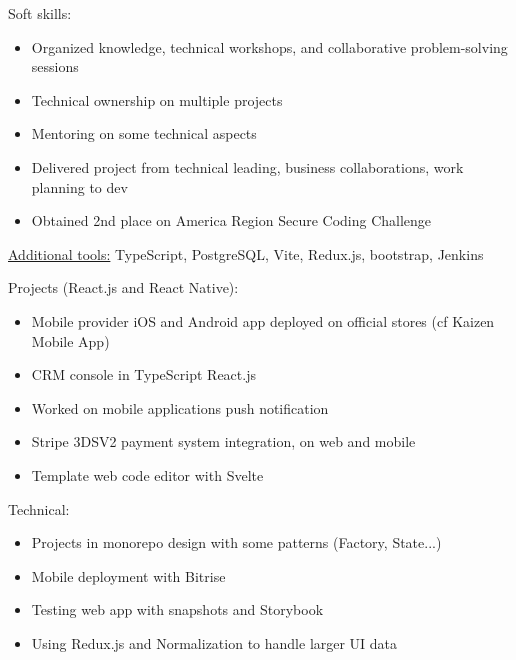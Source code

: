 \documentclass[11pt,a4paper,ragged2e,withhyper]{altacv}
\begin{document}
\medskip
Soft skills:
\begin{itemize}
  \item Organized knowledge, technical workshops, and collaborative problem-solving sessions
  \item Technical ownership on multiple projects
  \item Mentoring on some technical aspects
  \item Delivered project from technical leading, business collaborations, work planning to dev
  \item Obtained 2nd place on America Region Secure Coding Challenge
\end{itemize}
\begin{itshape}
\underline{Additional tools:}
\small{TypeScript, PostgreSQL, Vite, Redux.js, bootstrap, Jenkins}
\end{itshape}

\divider

\vspace{-.5\baselineskip}
\begin{minipage}[t]{0.45\textwidth}
  \vspace{0pt}
Projects (React.js and React Native):
  \begin{itemize}
    \item Mobile provider iOS and Android app deployed on official stores (cf Kaizen
    Mobile App)
    \item CRM console in TypeScript React.js
    \item Worked on mobile applications push notification
    \item Stripe 3DSV2 payment system integration, on web and mobile
    \item Template web code editor with Svelte
  \end{itemize}
\end{minipage}
\hfill
\begin{minipage}[t]{0.45\textwidth}
  \vspace{0pt}
  Technical:
  \begin{itemize}
    \item Projects in monorepo design with some patterns (Factory, State...)
    \item Mobile deployment with Bitrise
    \item Testing web app with snapshots and Storybook
    \item Using Redux.js and Normalization to handle larger UI data
  \end{itemize}
\end{minipage}
\end{document}
